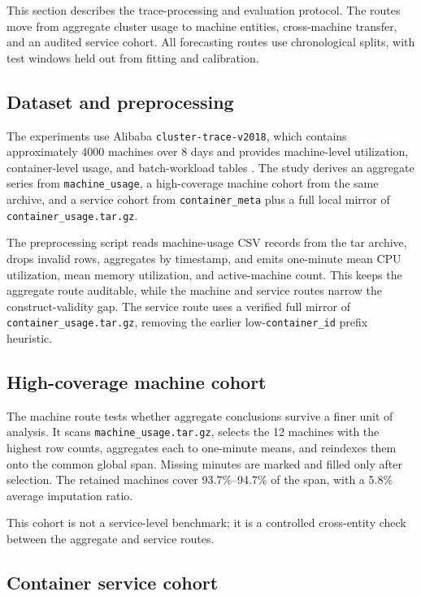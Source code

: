 \noindent This section describes the trace-processing and evaluation protocol. The routes move from aggregate cluster usage to machine entities, cross-machine transfer, and an audited service cohort. All forecasting routes use chronological splits, with test windows held out from fitting and calibration.

\subsection{Dataset and preprocessing}

The experiments use Alibaba \texttt{cluster-trace-v2018}, which contains approximately 4000 machines over 8 days and provides machine-level utilization, container-level usage, and batch-workload tables \citep{alibabav2018trace}. The study derives an aggregate series from \texttt{machine\_usage}, a high-coverage machine cohort from the same archive, and a service cohort from \texttt{container\_meta} plus a full local mirror of \texttt{container\_usage.tar.gz}.

The preprocessing script reads machine-usage CSV records from the tar archive, drops invalid rows, aggregates by timestamp, and emits one-minute mean CPU utilization, mean memory utilization, and active-machine count. This keeps the aggregate route auditable, while the machine and service routes narrow the construct-validity gap. The service route uses a verified full mirror of \texttt{container\_usage.tar.gz}, removing the earlier low-\texttt{container\_id} prefix heuristic.

\subsection{High-coverage machine cohort}

The machine route tests whether aggregate conclusions survive a finer unit of analysis. It scans \texttt{machine\_usage.tar.gz}, selects the 12 machines with the highest row counts, aggregates each to one-minute means, and reindexes them onto the common global span. Missing minutes are marked and filled only after selection. The retained machines cover 93.7\%--94.7\% of the span, with a 5.8\% average imputation ratio.

This cohort is not a service-level benchmark; it is a controlled cross-entity check between the aggregate and service routes.

\subsection{Container service cohort}

